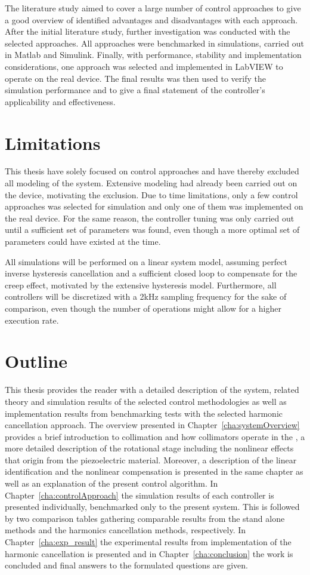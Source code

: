 The literature study aimed to cover a large number of control approaches to give a good overview of identified advantages and disadvantages with each approach. After the initial literature study, further investigation was conducted with the selected approaches. All approaches were benchmarked in simulations, carried out in Matlab and Simulink. Finally, with performance, stability and implementation considerations, one approach was selected and implemented in LabVIEW to operate on the real device. The final results was then used to verify the simulation performance and to give a final statement of the controller's applicability and effectiveness.

\section{Limitations}
This thesis have solely focused on control approaches and have thereby excluded all modeling of the system. Extensive modeling had already been carried out on the device, motivating the exclusion. Due to time limitations, only a few control approaches was selected for simulation and only one of them was implemented on the real device. For the same reason, the controller tuning was only carried out until a sufficient set of parameters was found, even though a more optimal set of parameters could have existed at the time.

All simulations will be performed on a linear system model, assuming perfect inverse hysteresis cancellation and a sufficient closed loop to compensate for the creep effect, motivated by the extensive hysteresis model. Furthermore, all controllers will be discretized with a 2kHz sampling frequency for the sake of comparison, even though the number of operations might allow for a higher execution rate.

\section{Outline}
This thesis provides the reader with a detailed description of the system, related theory and simulation results of the selected control methodologies as well as implementation results from benchmarking tests with the selected harmonic cancellation approach. The overview presented in Chapter~\ref{cha:systemOverview} provides a brief introduction to collimation and how collimators operate in the \abbrLHC, a more detailed description of the rotational stage including the nonlinear effects that origin from the piezoelectric material. Moreover, a description of the linear identification and the nonlinear compensation is presented in the same chapter as well as an explanation of the present control algorithm. In Chapter~\ref{cha:controlApproach} the simulation results of each controller is presented individually, benchmarked only to the present system. This is followed by two comparison tables gathering comparable results from the stand alone methods and the harmonics cancellation methods, respectively. In Chapter~\ref{cha:exp_result} the experimental results from implementation of the harmonic cancellation is presented and in Chapter~\ref{cha:conclusion} the work is concluded and final answers to the formulated questions are given.
